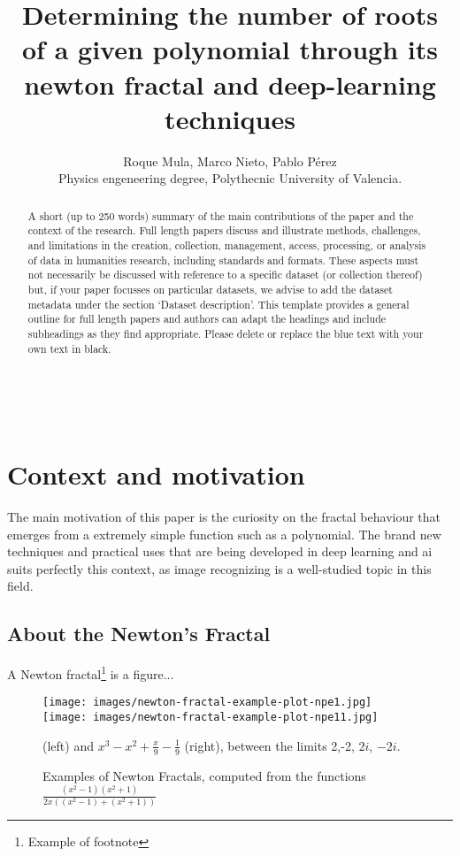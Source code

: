 \documentclass{article}
\title{Determining the number of roots of a given polynomial through its newton fractal and deep-learning techniques}
\author{Roque Mula, Marco Nieto, Pablo Pérez \\
        \small Physics engeneering degree, Polythecnic University of Valencia. \\
}
\date{} %
\begin{document}
\maketitle

\begin{abstract} 
\noindent A short (up to 250 words) summary of the main contributions of the paper and the context of the research. Full length papers discuss and illustrate methods, challenges, and limitations in the creation, collection, management, access, processing, or analysis of data in humanities research, including standards and formats. These aspects must not necessarily be discussed with reference to a specific dataset (or collection thereof) but, if your paper focusses on particular datasets, we advise to add the dataset metadata under the section ‘Dataset description’. This template provides a general outline for full length papers and authors can adapt the headings and include subheadings as they find appropriate. Please delete or replace the blue text with your own text in black.  \end{abstract}

\noindent{}\\

\noindent{} 

\section{Context and motivation}

The main motivation of this paper is the curiosity on the fractal behaviour that emerges from a extremely simple function such as a polynomial. The brand new techniques and practical uses that are being developed in deep learning and ai suits perfectly this context, as image recognizing is a well-studied topic in this field.

\subsection{About the Newton's Fractal}
\noindent A Newton fractal\footnote{Example of footnote} is a figure...

\begin{figure}[h!]
\centering
\texttt{[image: images/newton-fractal-example-plot-npe1.jpg]}
\texttt{[image: images/newton-fractal-example-plot-npe11.jpg]}
\caption{Examples of Newton Fractals, computed from the functions $\frac{(x^2-1)(x^2+1)}{2x((x^2-1)+(x^2+1))}$} (left) and $x^3-x^2+\frac{x}{9}-\frac{1}{9}$ (right), between the limits 2,-2, $2i$, $-2i$.
\label{exnewton}
\end{figure}
\end{document}
